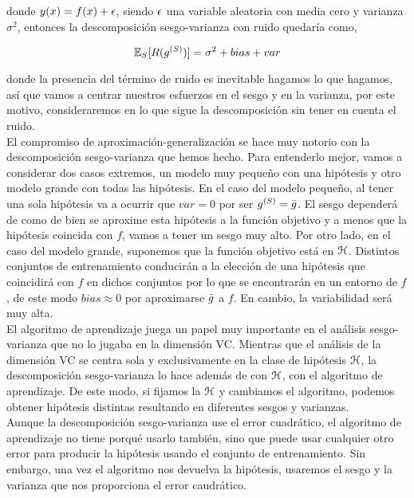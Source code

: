     \noindent donde $y(x) = f(x) + \epsilon$, siendo $\epsilon$ una variable aleatoria con media cero y varianza $\sigma^2$, entonces la descomposición sesgo-varianza con ruido quedaría como,
    
    \begin{equation}
        \mathbb{E}_S[R(g^{(S)})] = \sigma^2 + bias  + var
    \end{equation}
    
    \noindent donde la presencia del término de ruido es inevitable hagamos lo que hagamos, así que vamos a centrar nuestros esfuerzos en el sesgo y en la varianza, por este motivo, consideraremos en lo que sigue la descomposición sin tener en cuenta el ruido. \\
    
    El compromiso de aproximación-generalización se hace muy notorio con la descomposición sesgo-varianza que hemos hecho. Para entenderlo mejor, vamos a considerar dos casos extremos, un modelo muy pequeño con una hipótesis y otro modelo grande con todas las hipótesis. En el caso del modelo pequeño, al tener una sola hipótesis va a ocurrir que $var = 0$ por ser $g^{(S)} = \Bar{g}$. El sesgo dependerá de como de bien se aproxime esta hipótesis a la función objetivo y a menos que la hipótesis coincida con $f$, vamos a tener un sesgo muy alto. Por otro lado, en el caso del modelo grande, suponemos que la función objetivo está en $\mathcal{H}$. Distintos conjuntos de entrenamiento conducirán a la elección de una hipótesis que coincidirá con $f$ en dichos conjuntos por lo que se encontrarán en un entorno de $f$, de este modo $bias \approx 0$ por aproximarse $\Bar{g}$ a $f$. En cambio, la variabilidad será muy alta.\\
    
    
    El algoritmo de aprendizaje juega un papel muy importante en el análisis sesgo-varianza que no lo jugaba en la dimensión VC. Mientras que el análisis de la dimensión VC se centra sola y exclusivamente en la clase de hipótesis $\mathcal{H}$, la descomposición sesgo-varianza lo hace además de con $\mathcal{H}$, con el algoritmo de aprendizaje. De este modo, si fijamos la $\mathcal{H}$ y cambiamos el algoritmo, podemos obtener hipótesis distintas resultando en diferentes sesgos y varianzas. \\
    
    Aunque la descomposición sesgo-varianza use el error cuadrático, el algoritmo de aprendizaje no tiene porqué usarlo también, sino que puede usar cualquier otro error para producir la hipótesis usando el conjunto de entrenamiento. Sin embargo, una vez el algoritmo nos devuelva la hipótesis, usaremos el sesgo y la varianza que nos proporciona el error caudrático.\\
    
